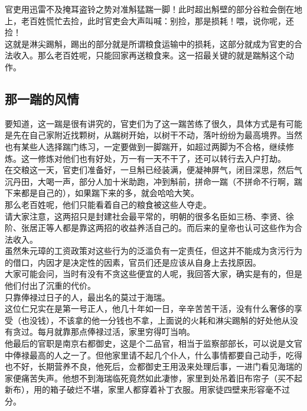 \begin{multicols}{\theparacolNo}
官吏用迅雷不及掩耳盗铃之势对准斛猛踹一脚！此时超出斛壁的部分谷粒会倒在地上，老百姓慌忙去捡，此时官吏会大声叫喊：别捡，那是损耗！喂，说你呢，还捡！\\

这就是淋尖踢斛，踢出的部分就是所谓粮食运输中的损耗，这部分就成为官吏的合法收入。那么老百姓呢，只能回家再送粮食来。这一招最关键的就是踹斛这个动作。\\

\subsection{那一踹的风情}
要知道，这一踹是很有讲究的，官吏们为了这一踹苦练了很久，具体方式是有可能是先在自己家附近找颗树，从踹树开始，以树干不动，落叶纷纷为最高境界。当然也有某些人选择踹门练习，一定要做到一脚踹开，如超过两脚为不合格，继续修炼。这一修炼对他们也有好处，万一有一天不干了，还可以转行去入户打劫。\\

在交粮这一天，官吏们准备好，一旦斛已经装满，便凝神屏气，闭目深思，然后气沉丹田，大喝一声，部分人加十米助跑，冲到斛前，拼命一踹（不拼命不行啊，踹下来都是自己的），如果踹下来的多，就会哈哈大笑。\\

那么老百姓呢，他们只能看着自己的粮食被这些人夺走。\\

请大家注意，这两招只是封建社会最平常的，明朝的很多名臣如三杨、李贤、徐阶、张居正等人都是靠这两招的收益养活自己的。而后来的皇帝也认可这些作为合法收入。\\

虽然朱元璋的工资政策对这些行为的泛滥负有一定责任，但这并不能成为贪污行为的借口，内因才是决定性的因素，官员们还是应该从自身上去找原因。\\

大家可能会问，当时有没有不贪这些便宜的人呢，我回答大家，确实是有的，但是他们付出了沉重的代价。\\

只靠俸禄过日子的人，最出名的莫过于海瑞。\\

这位仁兄实在是第一号正人，他几十年如一日，辛辛苦苦干活，没有什么奢侈的享受（也没钱），不该拿的他一分钱也不拿，上面说的火耗和淋尖踢斛的好处他从没有贪过。每月就靠那点俸禄过活，家里穷得叮当响。\\

他最后的官职是南京右都御史，这是个二品官，相当于监察部部长，可以说是文官中俸禄最高的人之一了。但他家里请不起几个仆人，什么事情都要自己动手，吃得也不好，长期营养不良，他死后，佥都御史王用汲来处理后事，一进门看见海瑞的家便痛苦失声。他想不到海瑞临死竟然如此凄惨，家里到处吊着旧布帘子（买不起新布），用的箱子破烂不堪，家里人都穿着补丁衣服。用家徒四壁来形容毫不过分。\\


\end{multicols}

